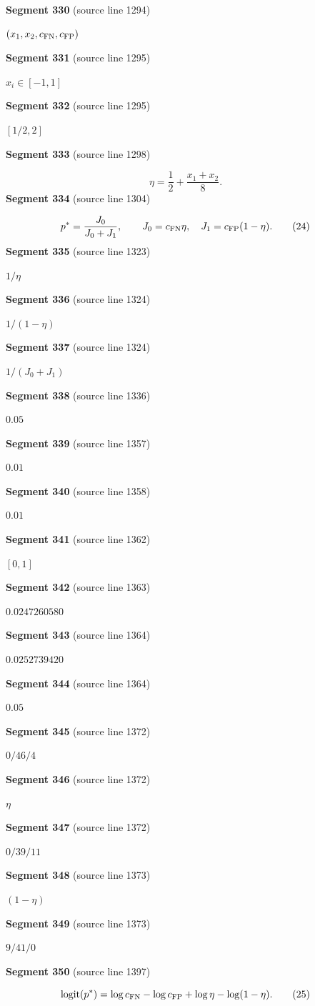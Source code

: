 \documentclass[11pt]{article}
\begin{document}
\textbf{Segment 330} (source line 1294)\par
\( (x_1,x_2,c_{\rm FN},c_{\rm FP}) \)\par
\textbf{Segment 331} (source line 1295)\par
\( x_i\in[-1,1] \)\par
\textbf{Segment 332} (source line 1295)\par
\( [1/2,2] \)\par
\textbf{Segment 333} (source line 1298)\par
\[
\eta=\frac12+\frac{x_1+x_2}{8}.
\]
\textbf{Segment 334} (source line 1304)\par
\[
p^*=\frac{J_0}{J_0+J_1},\qquad
J_0=c_{\rm FN}\eta,\quad
J_1=c_{\rm FP}(1-\eta).
\tag{24}
\]
\textbf{Segment 335} (source line 1323)\par
\( 1/\eta \)\par
\textbf{Segment 336} (source line 1324)\par
\( 1/(1-\eta) \)\par
\textbf{Segment 337} (source line 1324)\par
\( 1/(J_0+J_1) \)\par
\textbf{Segment 338} (source line 1336)\par
\( 0.05 \)\par
\textbf{Segment 339} (source line 1357)\par
\( 0.01 \)\par
\textbf{Segment 340} (source line 1358)\par
\( 0.01 \)\par
\textbf{Segment 341} (source line 1362)\par
\( [0,1] \)\par
\textbf{Segment 342} (source line 1363)\par
\( 0.0247260580 \)\par
\textbf{Segment 343} (source line 1364)\par
\( 0.0252739420 \)\par
\textbf{Segment 344} (source line 1364)\par
\( 0.05 \)\par
\textbf{Segment 345} (source line 1372)\par
\( 0/46/4 \)\par
\textbf{Segment 346} (source line 1372)\par
\( \eta \)\par
\textbf{Segment 347} (source line 1372)\par
\( 0/39/11 \)\par
\textbf{Segment 348} (source line 1373)\par
\( (1-\eta) \)\par
\textbf{Segment 349} (source line 1373)\par
\( 9/41/0 \)\par
\textbf{Segment 350} (source line 1397)\par
\[
\mathrm{logit}(p^*)
 =\log c_{\rm FN}-\log c_{\rm FP}
  +\log\eta-\log(1-\eta).
\tag{25}
\]
\end{document}
